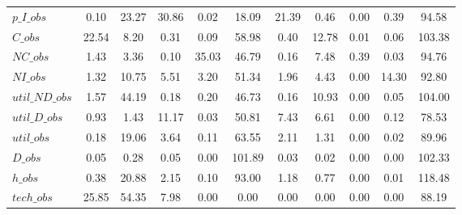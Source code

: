 \begin{center}
\begin{longtable}{lcccccccccc}
$p\_I\_obs      $	 & 	                0.10	 & 	               23.27	 & 	               30.86	 & 	                0.02	 & 	               18.09	 & 	               21.39	 & 	                0.46	 & 	                0.00	 & 	                0.39	 & 	               94.58 \\ 
$C\_obs         $	 & 	               22.54	 & 	                8.20	 & 	                0.31	 & 	                0.09	 & 	               58.98	 & 	                0.40	 & 	               12.78	 & 	                0.01	 & 	                0.06	 & 	              103.38 \\ 
$NC\_obs        $	 & 	                1.43	 & 	                3.36	 & 	                0.10	 & 	               35.03	 & 	               46.79	 & 	                0.16	 & 	                7.48	 & 	                0.39	 & 	                0.03	 & 	               94.76 \\ 
$NI\_obs        $	 & 	                1.32	 & 	               10.75	 & 	                5.51	 & 	                3.20	 & 	               51.34	 & 	                1.96	 & 	                4.43	 & 	                0.00	 & 	               14.30	 & 	               92.80 \\ 
$util\_ND\_obs  $	 & 	                1.57	 & 	               44.19	 & 	                0.18	 & 	                0.20	 & 	               46.73	 & 	                0.16	 & 	               10.93	 & 	                0.00	 & 	                0.05	 & 	              104.00 \\ 
$util\_D\_obs   $	 & 	                0.93	 & 	                1.43	 & 	               11.17	 & 	                0.03	 & 	               50.81	 & 	                7.43	 & 	                6.61	 & 	                0.00	 & 	                0.12	 & 	               78.53 \\ 
$util\_obs      $	 & 	                0.18	 & 	               19.06	 & 	                3.64	 & 	                0.11	 & 	               63.55	 & 	                2.11	 & 	                1.31	 & 	                0.00	 & 	                0.02	 & 	               89.96 \\ 
$D\_obs         $	 & 	                0.05	 & 	                0.28	 & 	                0.05	 & 	                0.00	 & 	              101.89	 & 	                0.03	 & 	                0.02	 & 	                0.00	 & 	                0.00	 & 	              102.33 \\ 
$h\_obs         $	 & 	                0.38	 & 	               20.88	 & 	                2.15	 & 	                0.10	 & 	               93.00	 & 	                1.18	 & 	                0.77	 & 	                0.00	 & 	                0.01	 & 	              118.48 \\ 
$tech\_obs      $	 & 	               25.85	 & 	               54.35	 & 	                7.98	 & 	                0.00	 & 	                0.00	 & 	                0.00	 & 	                0.00	 & 	                0.00	 & 	                0.00	 & 	               88.19 \\ 
\end{longtable}
 \end{center}
